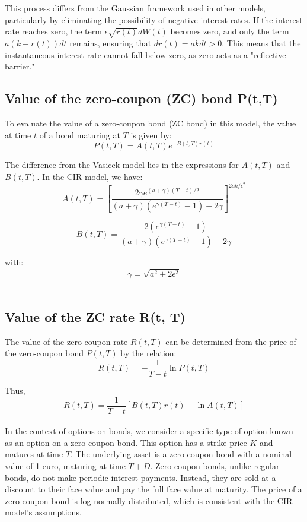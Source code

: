\documentclass[a4paper,10pt]{article}
\begin{document}
\noindent This process differs from the Gaussian framework used in other models, particularly by eliminating the possibility of negative interest rates. If the interest rate reaches zero, the term \( \epsilon \sqrt{r(t)} dW(t) \) becomes zero, and only the term \( a(k - r(t))dt \) remains, ensuring that \( dr(t) = ak dt > 0 \). This means that the instantaneous interest rate cannot fall below zero, as zero acts as a "reflective barrier." \\

\subsection{Value of the zero-coupon (ZC) bond P(t,T)}

\noindent To evaluate the value of a zero-coupon bond (ZC bond) in this model, the value at time \( t \) of a bond maturing at \( T \) is given by:
\[P(t, T) = A(t, T) e^{-B(t, T) r(t)}\]

\noindent The difference from the Vasicek model lies in the expressions for \( A(t, T) \) and \( B(t, T) \). In the CIR model, we have:
\[A(t, T) = \left[ \frac{2\gamma e^{(a+\gamma)(T-t)/2}}{(a+\gamma)(e^{\gamma (T-t)}-1) + 2\gamma} \right]^{2ak/\epsilon^2}\]

\[B(t, T) = \frac{2(e^{\gamma (T-t)} - 1)}{(a+\gamma)(e^{\gamma (T-t)} - 1) + 2\gamma}\]

\noindent with:
\[\gamma = \sqrt{a^2 + 2\epsilon^2}\]\\

\subsection{Value of the ZC rate R(t, T)}

\noindent The value of the zero-coupon rate \( R(t, T) \) can be determined from the price of the zero-coupon bond \( P(t, T) \) by the relation:
\[R(t, T) = -\frac{1}{T - t} \ln P(t, T)\]

\noindent Thus,
\[R(t, T) = \frac{1}{T - t} \left[B(t, T) r(t) - \ln A(t, T)\right]\]\\

\noindent In the context of options on bonds, we consider a specific type of option known as an option on a zero-coupon bond. This option has a strike price \( K \) and matures at time \( T \). The underlying asset is a zero-coupon bond with a nominal value of 1 euro, maturing at time \( T + D \). Zero-coupon bonds, unlike regular bonds, do not make periodic interest payments. Instead, they are sold at a discount to their face value and pay the full face value at maturity. The price of a zero-coupon bond is log-normally distributed, which is consistent with the CIR model's assumptions.\\
\end{document}
